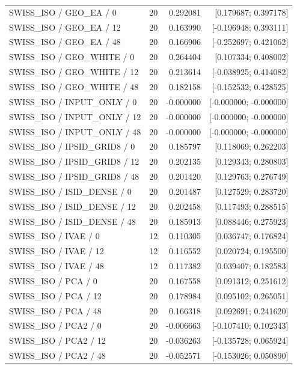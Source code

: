 \begin{longtable}{p{.56\linewidth}rrr}
SWISS\_ISO / GEO\_EA / 0 & 20 & 0.292081 & [0.179687; 0.397178] \\
SWISS\_ISO / GEO\_EA / 12 & 20 & 0.163990 & [-0.196948; 0.393111] \\
SWISS\_ISO / GEO\_EA / 48 & 20 & 0.166906 & [-0.252697; 0.421062] \\
SWISS\_ISO / GEO\_WHITE / 0 & 20 & 0.264404 & [0.107334; 0.408002] \\
SWISS\_ISO / GEO\_WHITE / 12 & 20 & 0.213614 & [-0.038925; 0.414082] \\
SWISS\_ISO / GEO\_WHITE / 48 & 20 & 0.182158 & [-0.152532; 0.428525] \\
SWISS\_ISO / INPUT\_ONLY / 0 & 20 & -0.000000 & [-0.000000; -0.000000] \\
SWISS\_ISO / INPUT\_ONLY / 12 & 20 & -0.000000 & [-0.000000; -0.000000] \\
SWISS\_ISO / INPUT\_ONLY / 48 & 20 & -0.000000 & [-0.000000; -0.000000] \\
SWISS\_ISO / IPSID\_GRID8 / 0 & 20 & 0.185797 & [0.118069; 0.262203] \\
SWISS\_ISO / IPSID\_GRID8 / 12 & 20 & 0.202135 & [0.129343; 0.280803] \\
SWISS\_ISO / IPSID\_GRID8 / 48 & 20 & 0.201420 & [0.129763; 0.276749] \\
SWISS\_ISO / ISID\_DENSE / 0 & 20 & 0.201487 & [0.127529; 0.283720] \\
SWISS\_ISO / ISID\_DENSE / 12 & 20 & 0.202458 & [0.117493; 0.288515] \\
SWISS\_ISO / ISID\_DENSE / 48 & 20 & 0.185913 & [0.088446; 0.275923] \\
SWISS\_ISO / IVAE / 0 & 12 & 0.110305 & [0.036747; 0.176824] \\
SWISS\_ISO / IVAE / 12 & 12 & 0.116552 & [0.020724; 0.195500] \\
SWISS\_ISO / IVAE / 48 & 12 & 0.117382 & [0.039407; 0.182583] \\
SWISS\_ISO / PCA / 0 & 20 & 0.167558 & [0.091312; 0.251612] \\
SWISS\_ISO / PCA / 12 & 20 & 0.178984 & [0.095102; 0.265051] \\
SWISS\_ISO / PCA / 48 & 20 & 0.166318 & [0.092691; 0.241620] \\
SWISS\_ISO / PCA2 / 0 & 20 & -0.006663 & [-0.107410; 0.102343] \\
SWISS\_ISO / PCA2 / 12 & 20 & -0.036263 & [-0.135728; 0.065924] \\
SWISS\_ISO / PCA2 / 48 & 20 & -0.052571 & [-0.153026; 0.050890] \\

\end{longtable}
